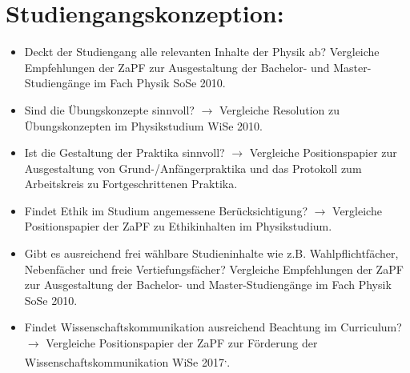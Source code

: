 \documentclass[DIV=calc]{scrartcl}
\begin{document}
	\section{Studiengangskonzeption:}
	\begin{itemize}
		\item Deckt der Studiengang alle relevanten Inhalte der Physik ab?
		Vergleiche Empfehlungen der ZaPF zur Ausgestaltung der Bachelor- und
		Master-Studiengänge im Fach Physik SoSe
		2010.
		\item Sind die Übungskonzepte sinnvoll? $\rightarrow$ Vergleiche
		Resolution zu Übungskonzepten im Physikstudium WiSe
		2010.
		\item Ist die Gestaltung der Praktika sinnvoll? $\rightarrow$ Vergleiche
		Positionspapier zur Ausgestaltung von
		Grund-/Anfängerpraktika
		und das Protokoll zum Arbeitskreis zu Fortgeschrittenen
		Praktika.
		\item Findet Ethik im Studium angemessene Berücksichtigung?
		$\rightarrow$ Vergleiche Positionspapier der ZaPF zu Ethikinhalten im
		Physikstudium.
		\item Gibt es ausreichend frei wählbare Studieninhalte wie z.B.
		Wahlpflichtfächer, Nebenfächer und freie Vertiefungsfächer? Vergleiche
		Empfehlungen der ZaPF zur Ausgestaltung der Bachelor- und
		Master-Studiengänge im Fach Physik SoSe
		2010.
		\item Findet Wissenschaftskommunikation ausreichend Beachtung im
		Curriculum? $\rightarrow$ Vergleiche Positionspapier der ZaPF zur
		Förderung der Wissenschaftskommunikation WiSe
		2017\textsuperscript{,}.
	\end{itemize}
\end{document}
